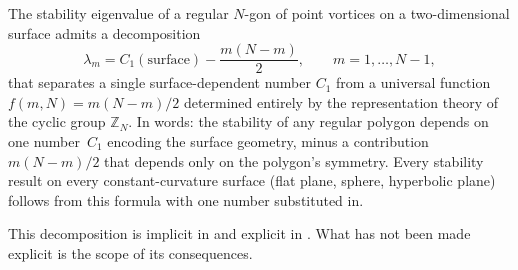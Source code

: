 The stability eigenvalue of a regular $N$-gon of point vortices on
a two-dimensional surface admits a decomposition
\begin{equation}\label{eq:central-decomposition}
  \lambda_m = C_1(\text{surface}) - \frac{m(N-m)}{2},
  \qquad m = 1, \ldots, N-1,
\end{equation}
that separates a single surface-dependent number $C_1$ from a
universal function $f(m,N) = m(N{-}m)/2$ determined entirely by the
representation theory of the cyclic group $\mathbb{Z}_N$.
In words: the stability of any regular polygon depends on one
number~$C_1$ encoding the surface geometry, minus a contribution
$m(N{-}m)/2$ that depends only on the polygon's symmetry.
Every stability result on every constant-curvature surface (flat
plane, sphere, hyperbolic plane) follows from this formula with
one number substituted in.

This decomposition is implicit in
\citet{Havelock1931} and explicit in \citet{BoattoCabral2003}.
What has not been made explicit is the scope of its
consequences.

